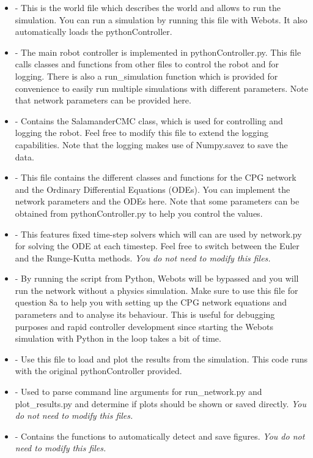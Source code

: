 \documentclass{cmc}
\begin{document}
\begin{itemize}
\item {} - This is the world file which
  describes the world and allows to run the simulation. You can run a simulation
  by running this file with Webots. It also automatically loads the
  pythonController.
\item {} - The
  main robot controller is implemented in pythonController.py. This file calls
  classes and functions from other files to control the robot and for
  logging. There is also a run\_simulation function which is provided for
  convenience to easily run multiple simulations with different parameters. Note
  that network parameters can be provided here.
\item {} - Contains the
  SalamanderCMC class, which is used for controlling and logging the robot. Feel
  free to modify this file to extend the logging capabilities. Note that the
  logging makes use of Numpy.savez to save the data.
\item {} - This file
  contains the different classes and functions for the CPG network and the
  Ordinary Differential Equations (ODEs). You can implement the network
  parameters and the ODEs here. Note that some parameters can be obtained from
  pythonController.py to help you control the values.
\item {} - This
  features fixed time-step solvers which will can are used by network.py for
  solving the ODE at each timestep. Feel free to switch between the Euler and
  the Runge-Kutta methods. \textit{You do not need to modify this files.}
\item {} - By running
  the script from Python, Webots will be bypassed and you will run the network
  without a physics simulation. Make sure to use this file for question 8a to
  help you with setting up the CPG network equations and parameters and to
  analyse its behaviour. This is useful for debugging purposes and rapid
  controller development since starting the Webots simulation with Python in the
  loop takes a bit of time.
\item {} -
  Use this file to load and plot the results from the simulation. This code runs
  with the original pythonController provided.
\item {} -
  Used to parse command line arguments for run\_network.py and plot\_results.py
  and determine if plots should be shown or saved directly. \textit{You do not
    need to modify this files.}
\item {} -
  Contains the functions to automatically detect and save figures. \textit{You
    do not need to modify this files.}
\end{itemize}
\end{document}
